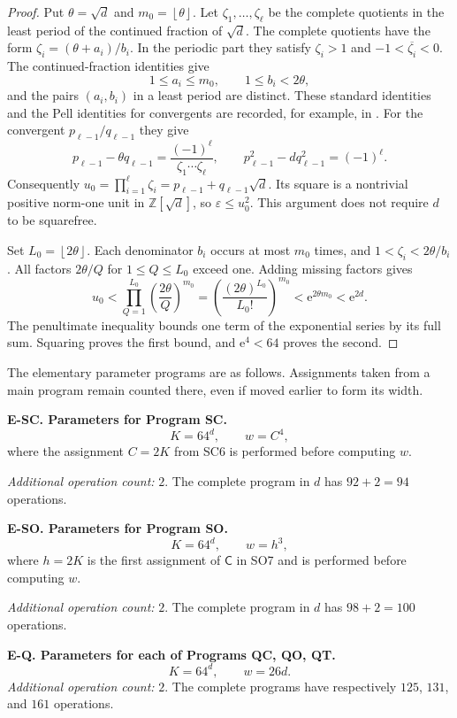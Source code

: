 \documentclass[11pt]{article}
\theoremstyle{remark}
\newcommand{\Z}{\mathbb Z}
\newcommand{\eps}{\varepsilon}
\newcommand{\fl}[1]{\left\lfloor #1\right\rfloor}
\newcommand{\Coord}{\mathsf{C}}
\begin{document}
\begin{proof}
Put $\theta=\sqrt d$ and $m_0=\fl\theta$.
Let $\zeta_1,\ldots,\zeta_\ell$ be the complete quotients in the
least period of the continued fraction of $\sqrt d$.
The complete quotients have the form
$\zeta_i=(\theta+a_i)/b_i$. In the periodic part they satisfy
$\zeta_i>1$ and $-1<\overline{\zeta_i}<0$.
The continued-fraction identities give
\[
  1\le a_i\le m_0,\qquad 1\le b_i<2\theta,
\]
and the pairs $(a_i,b_i)$ in a least period are distinct.
These standard identities and the Pell identities for convergents are
recorded, for example, in \cite{HardyWright}.
For the convergent $p_{\ell-1}/q_{\ell-1}$ they give
\[
  p_{\ell-1}-\theta q_{\ell-1}
    =\frac{(-1)^\ell}{\zeta_1\cdots\zeta_\ell},\qquad
  p_{\ell-1}^2-dq_{\ell-1}^2=(-1)^\ell.
\]
Consequently
$u_0=\prod_{i=1}^{\ell}\zeta_i=p_{\ell-1}+q_{\ell-1}\sqrt d$.
Its square is a nontrivial positive norm-one unit in $\Z[\sqrt d]$,
so $\eps\le u_0^2$. This argument does not require $d$ to be squarefree.

Set $L_0=\fl{2\theta}$. Each denominator $b_i$ occurs at most
$m_0$ times, and $1<\zeta_i<2\theta/b_i$.
All factors $2\theta/Q$ for $1\le Q\le L_0$ exceed one.
Adding missing factors gives
\[
  u_0<\prod_{Q=1}^{L_0}\left(\frac{2\theta}{Q}\right)^{m_0}
      =\left(\frac{(2\theta)^{L_0}}{L_0!}\right)^{m_0}
      <\mathrm e^{2\theta m_0}<\mathrm e^{2d}.
\]
The penultimate inequality bounds one term of the exponential series
by its full sum. Squaring proves the first bound, and
$\mathrm e^4<64$ proves the second.
\end{proof}

The elementary parameter programs are as follows. Assignments taken
from a main program remain counted there, even if moved earlier to
form its width.

\textbf{E-SC. Parameters for Program SC.}
\[
  K=64^d,\qquad w=C^4,
\]
where the assignment $C=2K$ from SC6 is performed before computing $w$.

\emph{Additional operation count:} $2$.
The complete program in $d$ has $92+2=94$ operations.

\textbf{E-SO. Parameters for Program SO.}
\[
  K=64^d,\qquad w=h^3,
\]
where $h=2K$ is the first assignment of $\Coord$ in SO7 and is
performed before computing $w$.

\emph{Additional operation count:} $2$.
The complete program in $d$ has $98+2=100$ operations.

\textbf{E-Q. Parameters for each of Programs QC, QO, QT.}
\[
  K=64^d,\qquad w=26d.
\]
\emph{Additional operation count:} $2$.
The complete programs have respectively $125$, $131$, and $161$ operations.
\end{document}
